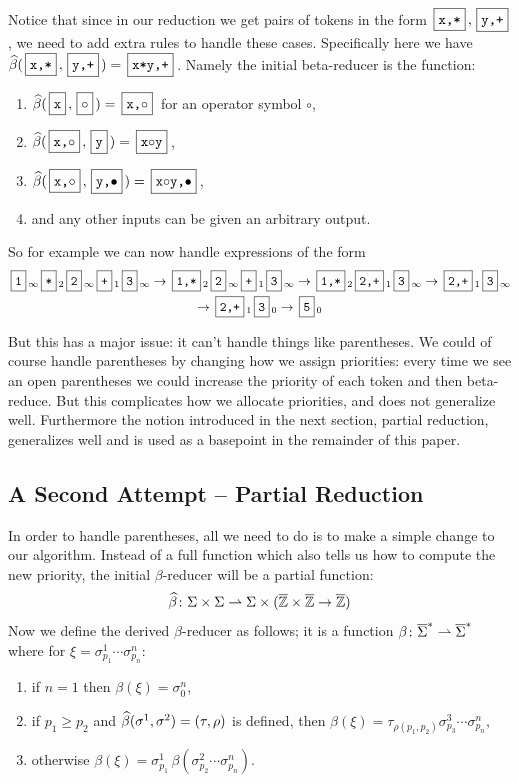 \documentclass{llncs}
\newcounter{algo}
\begin{document}
Notice that since in our reduction we get pairs of tokens in the form $\mbt{x,*},\mbt{y,+}$, we need to add extra rules to handle these cases.
Specifically here we have $\hb(\mbt{x,*},\mbt{y,+})=\mbt{x*y,+}$.
Namely the initial beta-reducer is the function:
\begin{enumerate}
    \item $\hb(\mbt x,\mb\circ)=\mbt{x,$\circ$}$ for an operator symbol $\circ$,
    \item $\hb(\mbt{x,$\circ$},\mbt y)=\mbt{x$\circ$y}$,
    \item $\hb(\mbt{x,$\circ$},\mbt{y,$\bullet$})=\mbt{x$\circ$y,$\bullet$}$,
    \item and any other inputs can be given an arbitrary output.
\end{enumerate}
So for example we can now handle expressions of the form
\begin{multline*}
    \mbt1_\infty \mbt*_2 \mbt2_\infty \mbt+_1 \mbt3_\infty \to \mbt{1,*}_2 \mbt2_\infty \mbt+_1 \mbt3_\infty \to \mbt{1,*}_2 \mbt{2,+}_1 \mbt3_\infty \to \mbt{2,+}_1 \mbt3_\infty\\
    \to \mbt{2,+}_1 \mbt3_0 \to \mbt5_0
\end{multline*}

But this has a major issue: it can't handle things like parentheses.
We could of course handle parentheses by changing how we assign priorities: every time we see an open parentheses we could increase
the priority of each token and then beta-reduce.
But this complicates how we allocate priorities, and does not generalize well.
Furthermore the notion introduced in the next section, partial reduction, generalizes well and is used as a basepoint in the
remainder of this paper.

\subsection{A Second Attempt -- Partial Reduction}

In order to handle parentheses, all we need to do is to make a simple change to our algorithm.
Instead of a full function which also tells us how to compute the new priority, the initial $\beta$-reducer will be a partial function:
\[ \widehat\beta\colon \Sigma\times\Sigma\rightharpoonup\Sigma\times(\overline{\mathbb Z}\times\overline{\mathbb Z}\to\overline{\mathbb Z}) \]
Now we define the derived $\beta$-reducer as follows; it is a function $\beta\colon\overline\Sigma^*\rightharpoonup\overline\Sigma^*$ where for $\xi=\sigma^1_{p_1}\cdots\sigma^n_{p_n}$:
\begin{enumerate}
    \item if $n=1$ then $\beta(\xi)=\sigma^n_0$,
    \item if $p_1\geq p_2$ and $\widehat\beta(\sigma^1,\sigma^2)=(\tau,\rho)$ is defined, then $\beta(\xi)=\tau_{\rho(p_1,p_2)}\sigma^3_{p_3}\cdots\sigma^n_{p_n}$,
    \item otherwise $\beta(\xi)=\sigma^1_{p_1}\,\beta(\sigma^2_{p_2}\cdots\sigma^n_{p_n})$.
\end{enumerate}
\end{document}
